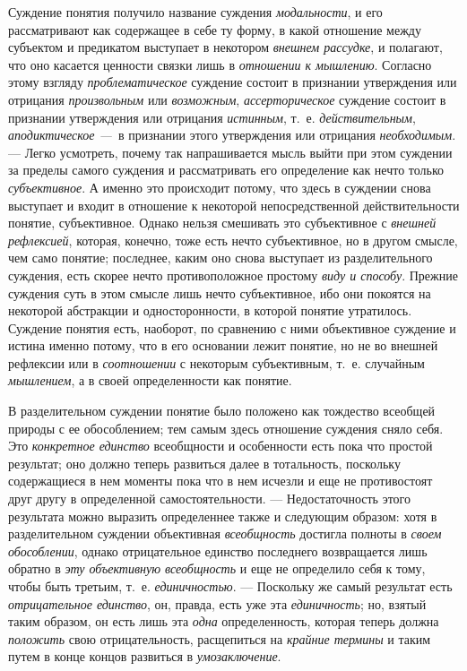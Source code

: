 \documentclass[twoside]{article}
\begin{document}
{{Суждение понятия получило название суждения
{\em модальности}, и его
рассматривают как содержащее в себе ту форму, в какой отношение между
субъектом и предикатом выступает в некотором
{\em внешнем рассудке}, и
полагают, что оно касается ценности связки лишь в
{\em отношении к мышлению}.
Согласно этому взгляду
{\em проблематическое}
суждение состоит в признании утверждения или отрицания
{\em произвольным} или
{\em возможным},
{\em ассерторическое}
суждение состоит в признании утверждения или отрицания
{\em истинным}, т.~е.
{\em действительным},
{\em аподиктическое —~}в
признании этого утверждения или отрицания
{\em необходимым}. —
Легко усмотреть, почему так напрашивается мысль выйти при
этом суждении за пределы самого суждения и рассматривать его определение
как нечто только {\em субъективное}.
А именно это происходит потому, что здесь в суждении снова
выступает и входит в отношение к некоторой непосредственной
действительности понятие, субъективное. Однако нельзя смешивать это
субъективное с {\em внешней
рефлексией}, которая, конечно, тоже есть нечто субъективное,
но в другом смысле, чем само понятие; последнее, каким оно снова выступает
из разделительного суждения, есть скорее нечто противоположное простому
{\em виду и способу}.
Прежние суждения суть в этом смысле лишь нечто субъективное,
ибо они покоятся на некоторой абстракции и односторонности, в которой
понятие утратилось. Суждение понятия есть, наоборот, по сравнению с ними
объективное суждение и истина именно потому, что в его основании лежит
понятие, но не во внешней рефлексии или в
{\em соотношении} с
некоторым субъективным, т.~е. случайным
{\em мышлением}, а в
своей определенности как понятие.

В разделительном суждении понятие было положено как тождество
всеобщей природы с ее обособлением; тем самым здесь отношение суждения
сняло себя. Это {\em конкретное
единство} всеобщности и особенности есть пока что простой
результат; оно должно теперь развиться далее в тотальность, поскольку
содержащиеся в нем моменты пока что в нем исчезли и еще не противостоят
друг другу в определенной самостоятельности. —
Недостаточность этого результата можно выразить определеннее
также и следующим образом: хотя в разделительном суждении объективная
{\em всеобщность}
достигла полноты в
{\em своем обособлении},
однако отрицательное единство последнего возвращается лишь
обратно в {\em эту объективную
всеобщность} и еще не определило себя к тому, чтобы быть
третьим, т.~е. {\em единичностью}. —
Поскольку же самый результат есть
{\em отрицательное единство},
он, правда, есть уже эта
{\em единичность}; но,
взятый таким образом, он есть лишь эта
{\em одна}
определенность, которая теперь должна
{\em положить} свою
отрицательность, расщепиться на
{\em крайние термины} и
таким путем в конце концов развиться в
{\em умозаключение}.

}}
\end{document}
